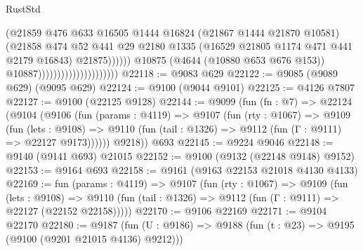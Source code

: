 \begin{lexlean}{RustStd}
\begin{coremodule}
                                                      (@21859
                                                        @476
                                                        @633
                                                        @16505
                                                        @1444
                                                        @16824
                                                        (@21867 @1444 @21870 @10581)
                                                        (@21858
                                                          @474
                                                          @52
                                                          @441
                                                          @29
                                                          @2180
                                                          @1335
                                                          (@16529
                                                            @21805
                                                            @1174
                                                            @471
                                                            @441
                                                            @2179
                                                            @16843)
                                                          @21875))))))
                                              @10875
                                              (@4644 (@10880 @653 @676 @153))
                                              @10887)))))))))))))))))))))
@22118 := @9083 @629
@22122 := @9085 (@9089 @629) (@9095 @629)
@22124 := @9100 (@9044 @9101)
@22125 := @4126 @7807
@22127 := @9100 (@22125 @9128)
@22144 := @9099
    (fun (fn : @7) =>
    @22124
      (@9104
        (@9106
          (fun (params : @4119) =>
          @9107
            (fun (rty : @1067) =>
            @9109
              (fun (lets : @9108) =>
              @9110 (fun (tail : @1326) => @9112 (fun (Γ : @9111) => @22127 @9173))))))
        @9218))
    @693
@22145 := @9224 @9046
@22148 := @9140 (@9141 @693) @21015
@22152 := @9100 (@9132 (@22148 @9148) @9152)
@22153 := @9164 @693
@22158 := @9161 (@9163 @22153 @21018 @4130 @4133)
@22169 := fun (params : @4119) =>
  @9107
    (fun (rty : @1067) =>
    @9109
      (fun (lets : @9108) =>
      @9110 (fun (tail : @1326) => @9112 (fun (Γ : @9111) => @22127 (@22152 @22158)))))
@22170 := @9106 @22169
@22171 := @9104 @22170
@22180 := @9187
    (fun (U : @9186) => @9188 (fun (t : @23) => @9195 (@9100 (@9201 @21015 @4136) @9212)))

\end{coremodule}
\end{lexlean}

